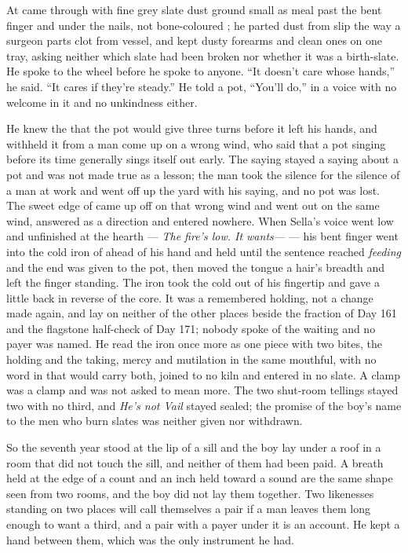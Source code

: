 \scenebreak

At   came through with fine grey slate dust ground small as meal past the bent finger and under the nails, not bone-coloured ; he parted dust from slip the way a surgeon parts clot from vessel, and kept dusty forearms and clean ones on one tray, asking neither which slate had been broken nor whether it was a birth-slate. He spoke to the wheel before he spoke to anyone. “It doesn't care whose hands,” he said. “It cares if they're steady.” He told a pot, “You'll do,” in a voice with no welcome in it and no unkindness either.

He knew the  that the pot would give three turns before it left his hands, and withheld it from a man come up on a wrong wind, who said that a pot singing before its time generally sings itself out early. The saying stayed a saying about a pot and was not made true as a lesson; the man took the silence for the silence of a man at work and went off up the yard with his saying, and no pot was lost. The sweet edge of  came up off  on that wrong wind and went out on the same wind, answered as a direction and entered nowhere. When Sella's voice went low and unfinished at the hearth --- \emph{The fire's low. It wants---} --- his bent finger went into the cold iron of  ahead of his hand and held until the sentence reached \emph{feeding} and the end was given to the pot, then moved the tongue a hair's breadth and left the finger standing. The iron took the cold out of his fingertip and gave a little back in reverse of the core. It was a remembered holding, not a change made again, and lay on neither of the other places beside the fraction of Day 161 and the flagstone half-check of Day 171; nobody spoke of the waiting and no payer was named. He read the iron once more as one piece with two bites, the holding and the taking, mercy and mutilation in the same mouthful, with no word in  that would carry both, joined to no kiln and entered in no slate. A clamp was a clamp and was not asked to mean more. The two shut-room tellings stayed two with no third, and \emph{He's not Vail} stayed sealed; the promise of the boy's name to the men who burn slates was neither given nor withdrawn.

So the seventh year stood at the lip of a sill and the boy lay under a roof in a room that did not touch the sill, and neither of them had been paid. A breath held at the edge of a count and an inch held toward a sound are the same shape seen from two rooms, and the boy did not lay them together. Two likenesses standing on two places will call themselves a pair if a man leaves them long enough to want a third, and a pair with a payer under it is an account. He kept a hand between them, which was the only instrument he had.

